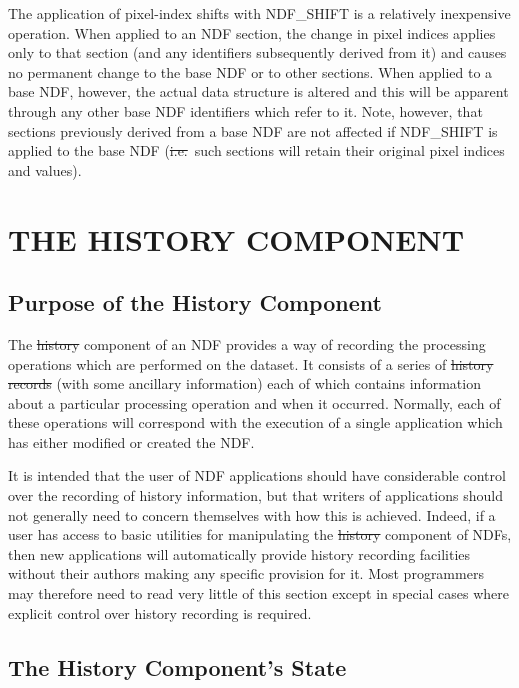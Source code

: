 The application of pixel-index shifts with NDF\_SHIFT is a relatively
inexpensive operation. 
When applied to an NDF section, the change in pixel indices applies only to
that section (and any identifiers subsequently derived from it) and causes
no permanent change to the base NDF or to other sections.
When applied to a base NDF, however, the actual data structure is altered and
this will be apparent through any other base NDF identifiers which refer to
it.
Note, however, that sections previously derived from a base NDF are not
affected if NDF\_SHIFT is applied to the base NDF (\st{i.e.}\ such sections
will retain their original pixel indices and values). 


\section{\label{ss:history}THE HISTORY COMPONENT}

\subsection{Purpose of the History Component}

The \st{history\/} component of an NDF provides a way of recording the
processing operations which are performed on the dataset.  It consists
of a series of \st{history records\/} (with some ancillary information)
each of which contains information about a particular processing
operation and when it occurred.  Normally, each of these operations
will correspond with the execution of a single application which has
either modified or created the NDF.

It is intended that the user of NDF applications should have
considerable control over the recording of history information, but
that writers of applications should not generally need to concern
themselves with how this is achieved.  Indeed, if a user has access to
basic utilities for manipulating the \st{history\/} component of NDFs,
then new applications will automatically provide history recording
facilities without their authors making any specific provision for it.
Most programmers may therefore need to read very little of this
section except in special cases where explicit control over history
recording is required.

\subsection{The History Component's State}


